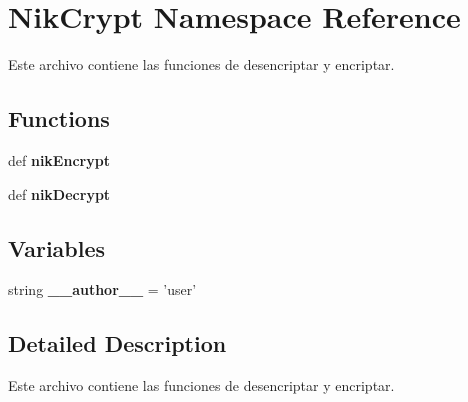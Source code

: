 \hypertarget{namespace_nik_crypt}{\section{Nik\-Crypt Namespace Reference}
\label{namespace_nik_crypt}
}


Este archivo contiene las funciones de desencriptar y encriptar.  


\subsection*{Functions}
\begin{DoxyCompactItemize}
\item 
\hypertarget{namespace_nik_crypt_ab1be1cdff363132c4ff972e3a58d405e}{def {\bfseries nik\-Encrypt}}\label{namespace_nik_crypt_ab1be1cdff363132c4ff972e3a58d405e}

\item 
\hypertarget{namespace_nik_crypt_a963556cc97e7c297bd363d225f08ba1e}{def {\bfseries nik\-Decrypt}}\label{namespace_nik_crypt_a963556cc97e7c297bd363d225f08ba1e}

\end{DoxyCompactItemize}
\subsection*{Variables}
\begin{DoxyCompactItemize}
\item 
\hypertarget{namespace_nik_crypt_a712c7e8aab82ca963e4d373756e2214d}{string {\bfseries \-\_\-\-\_\-author\-\_\-\-\_\-} = 'user'}\label{namespace_nik_crypt_a712c7e8aab82ca963e4d373756e2214d}

\end{DoxyCompactItemize}


\subsection{Detailed Description}
Este archivo contiene las funciones de desencriptar y encriptar. 